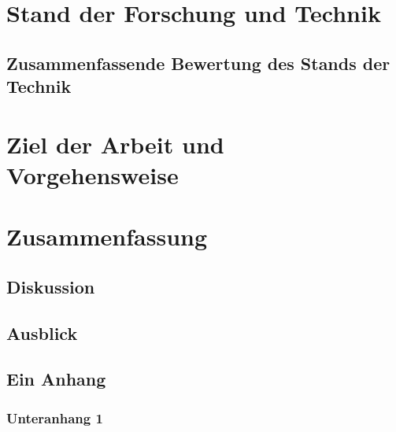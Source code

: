 \documentclass[
english, ngerman,%
twoside, %
toc=bib,
BCOR=6mm, %
]{isw_smb_diss} %
\numberwithin{equation}{chapter} %
\begin{document}
\chapter{Stand der Forschung und Technik}
\section{Zusammenfassende Bewertung des Stands der Technik}

\chapter{Ziel der Arbeit und Vorgehensweise}



\chapter{Zusammenfassung}
\section{Diskussion}
\section{Ausblick}

\nocite{*}

\setlength{\emergencystretch}{.5em}
\printbibliography[title={Literatur}]





\startSMBAppendix

\section{Ein Anhang}
\subsection{Unteranhang 1}
\end{document}
